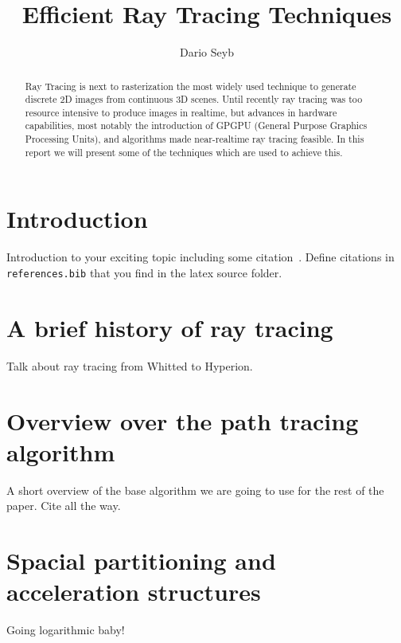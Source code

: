 \documentclass{ACGSeminar}
\begin{document}
\title{Efficient Ray Tracing Techniques}

\author{Dario Seyb}

\maketitle


\begin{abstract}%
Ray Tracing is next to rasterization the most widely used technique to generate discrete 2D images from continuous 3D scenes. Until recently ray tracing was too resource intensive to produce images in realtime, but advances in hardware capabilities, most notably the introduction of GPGPU (General Purpose Graphics Processing Units), and algorithms made near-realtime ray tracing feasible. In this report we will present some of the techniques which are used to achieve this.
\end{abstract}

\tableofcontents


\section{Introduction}

Introduction to your exciting topic including
some citation~\cite{Pharr:2010:PBR:1854996}. Define citations
in \verb+references.bib+ that you find in
the latex source folder.


\section{A brief history of ray tracing}
Talk about ray tracing from Whitted to Hyperion.

\section{Overview over the path tracing algorithm}
A short overview of the base algorithm we are going to use for the rest of the paper. Cite \cite{veach1997robust} all the way.

\section{Spacial partitioning and acceleration structures}
Going logarithmic baby!
\end{document}
